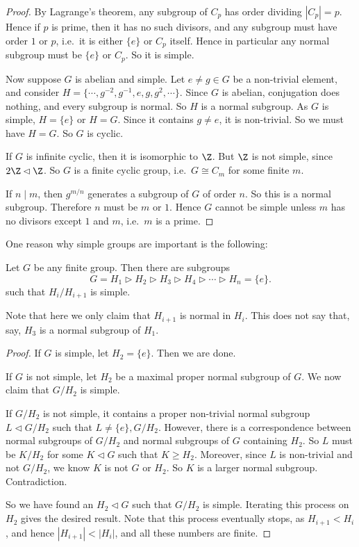 \documentclass[a4paper]{article}
\begin{document}
\begin{proof}
  By Lagrange's theorem, any subgroup of $C_p$ has order dividing $|C_p| = p$. Hence if $p$ is prime, then it has no such divisors, and any subgroup must have order $1$ or $p$, i.e.\ it is either $\{e\}$ or $C_p$ itself. Hence in particular any normal subgroup must be $\{e\}$ or $C_p$. So it is simple.

  Now suppose $G$ is abelian and simple. Let $e \not= g \in G$ be a non-trivial element, and consider $H = \{\cdots, g^{-2}, g^{-1}, e, g, g^2, \cdots\}$. Since $G$ is abelian, conjugation does nothing, and every subgroup is normal. So $H$ is a normal subgroup. As $G$ is simple, $H = \{e\}$ or $H = G$. Since it contains $g \not= e$, it is non-trivial. So we must have $H = G$. So $G$ is cyclic.

  If $G$ is infinite cyclic, then it is isomorphic to $\Z$. But $\Z$ is not simple, since $2\Z \lhd \Z$. So $G$ is a finite cyclic group, i.e.\ $G \cong C_m$ for some finite $m$.

  If $n \mid m$, then $g^{m/n}$ generates a subgroup of $G$ of order $n$. So this is a normal subgroup. Therefore $n$ must be $m$ or $1$. Hence $G$ cannot be simple unless $m$ has no divisors except $1$ and $m$, i.e.\ $m$ is a prime.
\end{proof}

One reason why simple groups are important is the following:
\begin{thm}
  Let $G$ be any finite group. Then there are subgroups
  \[
    G = H_1 \rhd H_2 \rhd H_3 \rhd H_4 \rhd \cdots \rhd H_n = \{e\}.
  \]
  such that $H_i/H_{i + 1}$ is simple.
\end{thm}
Note that here we only claim that $H_{i + 1}$ is normal in $H_i$. This does not say that, say, $H_3$ is a normal subgroup of $H_1$.

\begin{proof}
  If $G$ is simple, let $H_2 = \{e\}$. Then we are done.

  If $G$ is not simple, let $H_2$ be a maximal proper normal subgroup of $G$. We now claim that $G/H_2$ is simple.

  If $G/H_2$ is not simple, it contains a proper non-trivial normal subgroup $L \lhd G/H_2$ such that $L \not= \{e\}, G/H_2$. However, there is a correspondence between normal subgroups of $G/H_2$ and normal subgroups of $G$ containing $H_2$. So $L$ must be $K/H_2$ for some $K \lhd G$ such that $K \geq H_2$. Moreover, since $L$ is non-trivial and not $G/H_2$, we know $K$ is not $G$ or $H_2$. So $K$ is a larger normal subgroup. Contradiction.

  So we have found an $H_2 \lhd G$ such that $G/H_2$ is simple. Iterating this process on $H_2$ gives the desired result. Note that this process eventually stops, as $H_{i + 1} < H_i$, and hence $|H_{i + 1}| < |H_i|$, and all these numbers are finite.
\end{proof}
\end{document}
